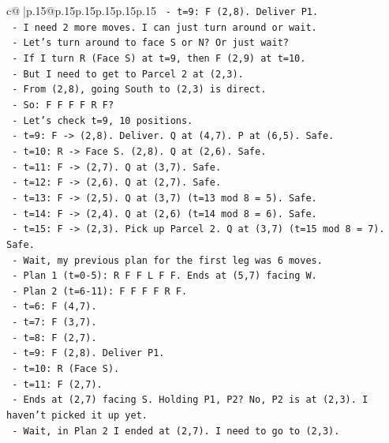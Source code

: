 \documentclass{article}
\begin{document}
{\begin{supertabular}{c@{$\;$}|p{.15\linewidth}@{}p{.15\linewidth}p{.15\linewidth}p{.15\linewidth}p{.15\linewidth}p{.15\linewidth}}
{{{\texttt{    {-} t=9: F (2,8). Deliver P1.} \\
\texttt{    {-} I need 2 more moves. I can just turn around or wait.} \\
\texttt{    {-} Let's turn around to face S or N? Or just wait?} \\
\texttt{    {-} If I turn R (Face S) at t=9, then F (2,9) at t=10.} \\
\texttt{    {-} But I need to get to Parcel 2 at (2,3).} \\
\texttt{    {-} From (2,8), going South to (2,3) is direct.} \\
\texttt{    {-} So: F F F F R F?} \\
\texttt{    {-} Let's check t=9, 10 positions.} \\
\texttt{    {-} t=9: F {-}> (2,8). Deliver. Q at (4,7). P at (6,5). Safe.} \\
\texttt{    {-} t=10: R {-}> Face S. (2,8). Q at (2,6). Safe.} \\
\texttt{    {-} t=11: F {-}> (2,7). Q at (3,7). Safe.} \\
\texttt{    {-} t=12: F {-}> (2,6). Q at (2,7). Safe.} \\
\texttt{    {-} t=13: F {-}> (2,5). Q at (3,7) (t=13 mod 8 = 5). Safe.} \\
\texttt{    {-} t=14: F {-}> (2,4). Q at (2,6) (t=14 mod 8 = 6). Safe.} \\
\texttt{    {-} t=15: F {-}> (2,3). Pick up Parcel 2. Q at (3,7) (t=15 mod 8 = 7). Safe.} \\
\texttt{    {-} Wait, my previous plan for the first leg was 6 moves.} \\
\texttt{    {-} Plan 1 (t=0{-}5): R F F L F F. Ends at (5,7) facing W.} \\
\texttt{    {-} Plan 2 (t=6{-}11): F F F F R F.} \\
\texttt{      {-} t=6: F (4,7).} \\
\texttt{      {-} t=7: F (3,7).} \\
\texttt{      {-} t=8: F (2,7).} \\
\texttt{      {-} t=9: F (2,8). Deliver P1.} \\
\texttt{      {-} t=10: R (Face S).} \\
\texttt{      {-} t=11: F (2,7).} \\
\texttt{      {-} Ends at (2,7) facing S. Holding P1, P2? No, P2 is at (2,3). I haven't picked it up yet.} \\
\texttt{      {-} Wait, in Plan 2 I ended at (2,7). I need to go to (2,3).} \\
}}}
\end{supertabular}}
\end{document}

